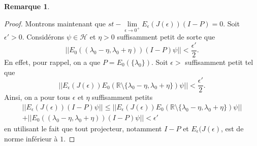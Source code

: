 \documentclass[12pt,openany,a4paper, titlepage]{article}
\newcommand{\f}[2]{\frac{#1}{#2}}
\newcommand{\R}{\mathbb{R}}
\theoremstyle{definition}
\theoremstyle{definition}
\theoremstyle{definition}
\theoremstyle{definition}
\theoremstyle{definition}
\newtheorem{rem}{Remarque}
\theoremstyle{definition}
\begin{document}
\begin{rem}
\begin{proof}
Montrons maintenant que $st-\lim\limits_{\epsilon\rightarrow 0^+} E_{\epsilon} (J(\epsilon))(I-P) = 0$. Soit $\epsilon'>0$. Considérons $\psi \in \mathcal{H}$ et $\eta>0$ suffisamment petit de sorte que 
\begin{equation}
    ||E_0((\lambda_0 - \eta, \lambda_0 + \eta))(I-P)\psi|| <  \f{\epsilon'}{2}.
\end{equation}
En effet, pour rappel, on a que $P=E_0(\{\lambda_0\})$. Soit $\epsilon>$ suffisamment petit tel que
\begin{equation}
    || E_\epsilon(J(\epsilon))E_0(\R \setminus\{ \lambda_0 - \eta, \lambda_0 + \eta \})\psi|| < \f{\epsilon'}{2}.
\end{equation}
Ainsi, on a pour tous $\epsilon$ et $\eta$ suffisamment petits
\begin{multline}
    ||E_{\epsilon}(J(\epsilon))(I-P)\psi|| \leq || E_\epsilon(J(\epsilon))E_0(\R \setminus\{ \lambda_0 - \eta, \lambda_0 + \eta \})\psi|| \\ + ||E_0((\lambda_0 - \eta, \lambda_0 + \eta))(I-P)\psi|| < \epsilon'
\end{multline}
en utilisant le fait que tout projecteur, notamment $I-P$ et $E_\epsilon(J(\epsilon)$, est de norme inférieur à $1$.


\end{proof}
\end{rem}
\end{document}
